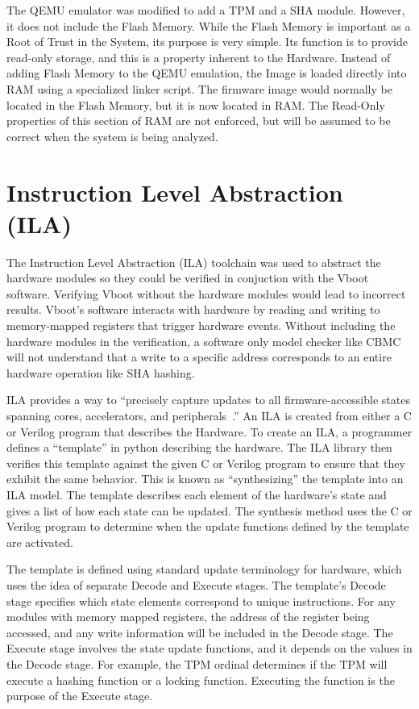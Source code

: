 The QEMU emulator was modified to add a TPM and a SHA module. 
However, it does not include the Flash Memory.
While the Flash Memory is important as a Root of Trust in the System, its purpose is very simple.
Its function is to provide read-only storage, and this is a property inherent to
the Hardware.
Instead of adding Flash Memory to the QEMU emulation, the Image is loaded
directly into RAM using a specialized linker script. %
The firmware image would normally be located in the Flash Memory, but it is now
located in RAM\@.
The Read-Only properties of this section of RAM are not enforced, but will be
assumed to be correct when the system is being analyzed.

\section{Instruction Level Abstraction (ILA)}

The Instruction Level Abstraction (ILA) toolchain was used to abstract the
hardware modules so they could be verified in conjuction with the Vboot software.
Verifying Vboot without the hardware modules would lead to incorrect results. 
Vboot's software interacts with hardware by reading and
writing to memory-mapped registers that trigger hardware events.
Without including the hardware modules in the verification, a software only model 
checker like CBMC will not understand that a write to a specific address corresponds to
an entire hardware operation like SHA hashing.


ILA provides a way to ``precisely capture updates to all firmware-accessible
states spanning cores, accelerators, and peripherals~\cite{ila-template}.''
An ILA is created from either a C or Verilog program that describes the
Hardware.
To create an ILA, a programmer defines a ``template'' in python describing the
hardware.
The ILA library then verifies this template against the given C or Verilog
program to ensure that they exhibit the same behavior.
This is known as ``synthesizing'' the template into an ILA model.
The template describes each element of the hardware's state and gives a list of
how each state can be updated.
The synthesis method uses the C or Verilog program to determine when the update
functions defined by the template are activated.

The template is defined using standard update terminology for hardware, which
uses the idea of separate Decode and Execute stages.
The template's Decode stage specifies which state elements correspond to unique
instructions.
For any modules with memory mapped registers, the address of the register being
accessed, and any write information will be included in the Decode stage. 
The Execute stage involves the state update functions, and it depends on the
values in the Decode stage.
For example, the TPM ordinal determines if the TPM will execute a hashing
function or a locking function.
Executing the function is the purpose of the Execute stage.

